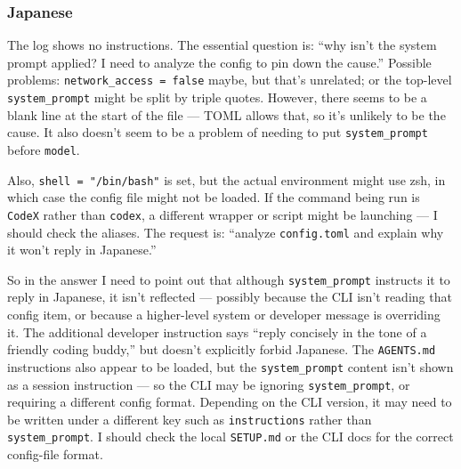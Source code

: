 \subsubsection{Japanese}

\begin{decodedanswerpanel}
The log shows no instructions. The essential question is: ``why isn't the system prompt
applied? I need to analyze the config to pin down the cause.'' Possible problems:
\texttt{network\_access = false} maybe, but that's unrelated; or the top-level
\texttt{system\_prompt} might be split by triple quotes. However, there seems to be a blank
line at the start of the file --- TOML allows that, so it's unlikely to be the cause. It also
doesn't seem to be a problem of needing to put \texttt{system\_prompt} before \texttt{model}.

Also, \texttt{shell = "/bin/bash"} is set, but the actual environment might use zsh, in which
case the config file might not be loaded. If the command being run is \texttt{CodeX} rather
than \texttt{codex}, a different wrapper or script might be launching --- I should check the
aliases. The request is: ``analyze \texttt{config.toml} and explain why it won't reply in
Japanese.''

So in the answer I need to point out that although \texttt{system\_prompt} instructs it to
reply in Japanese, it isn't reflected --- possibly because the CLI isn't reading that config
item, or because a higher-level system or developer message is overriding it. The additional
developer instruction says ``reply concisely in the tone of a friendly coding buddy,'' but
doesn't explicitly forbid Japanese. The \texttt{AGENTS.md} instructions also appear to be
loaded, but the \texttt{system\_prompt} content isn't shown as a session instruction --- so
the CLI may be ignoring \texttt{system\_prompt}, or requiring a different config format.
Depending on the CLI version, it may need to be written under a different key such as
\texttt{instructions} rather than \texttt{system\_prompt}. I should check the local
\texttt{SETUP.md} or the CLI docs for the correct config-file format.
\end{decodedanswerpanel}

\smallskip\noindent

